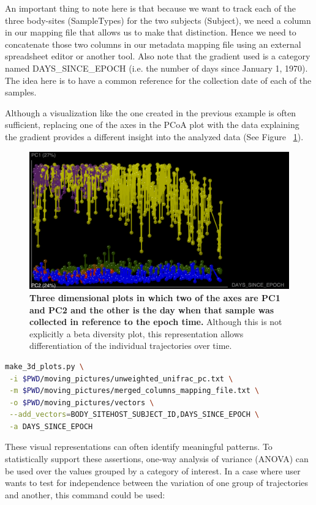 An important thing to note here is that because we want to track each of the three
body-sites (SampleTypes) for the two subjects (Subject), we need a column in our
mapping file that allows us to make that distinction. Hence we need to concatenate
those two columns in our metadata mapping file using an external spreadsheet editor or
another tool. Also note that the gradient used is a category named DAYS\_SINCE\_EPOCH
(i.e. the number of days since January 1, 1970). The idea here is to have a common
reference for the collection date of each of the samples.

Although a visualization like the one created in the previous example is often sufficient,
replacing one of the axes in the PCoA plot with the data explaining the gradient provides a
different insight into the analyzed data (See Figure ~\ref{bfigure21}).

\begin{figure}[htbp]
\includegraphics[width=0.75\columnwidth]{chapter_book_figures/Figure_21.jpg}
\caption[Three dimensional plots in which two of the axes are PC1 and PC2 and the other is the day when that sample was collected in reference to the epoch time]{\textbf{Three dimensional plots in which two of the axes are PC1 and PC2 and the other is the day when that sample was collected in reference to the epoch time.}
Although this is not explicitly a beta diversity plot, this representation allows differentiation of the individual trajectories over time.}
\label{bfigure21}
\end{figure}

\begin{lstlisting}[language=bash]
make_3d_plots.py \
 -i $PWD/moving_pictures/unweighted_unifrac_pc.txt \
 -m $PWD/moving_pictures/merged_columns_mapping_file.txt \
 -o $PWD/moving_pictures/vectors \
 --add_vectors=BODY_SITEHOST_SUBJECT_ID,DAYS_SINCE_EPOCH \
 -a DAYS_SINCE_EPOCH
\end{lstlisting}

These visual representations can often identify meaningful patterns. To statistically
support these assertions, one-way analysis of variance (ANOVA) can be used over the
values grouped by a category of interest. In a case where user wants to test for
independence between the variation of one group of trajectories and another,
this command could be used:

